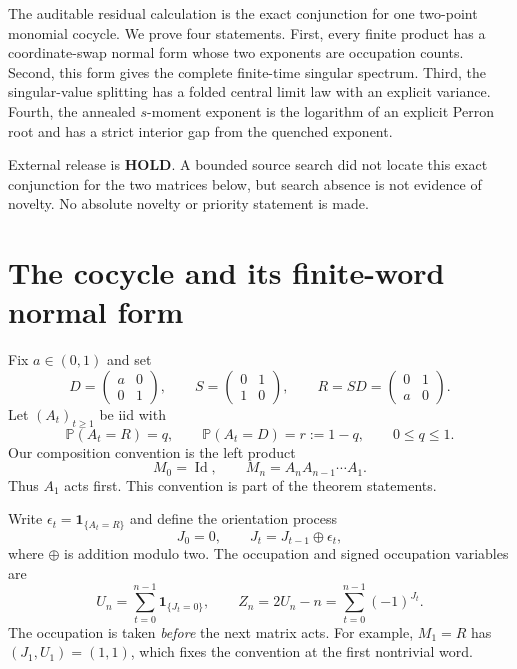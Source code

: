 \documentclass[11pt,a4paper]{amsart}
\theoremstyle{definition}
\theoremstyle{remark}
\newcommand{\Prob}{\mathbb P}
\newcommand{\Id}{\operatorname{Id}}
\newcommand{\one}{\mathbf 1}
\begin{document}
The auditable residual calculation is the exact conjunction for one
two-point monomial cocycle.  We prove four statements.  First, every
finite product has a coordinate-swap normal form whose two exponents are
occupation counts.  Second, this form gives the complete finite-time
singular spectrum.  Third, the singular-value splitting has a folded
central limit law with an explicit variance.  Fourth, the annealed
$s$-moment exponent is the logarithm of an explicit Perron root and has a
strict interior gap from the quenched exponent.

External release is \textbf{HOLD}.  A bounded source search did not locate
this exact conjunction for the two matrices below, but search absence is
not evidence of novelty.  No absolute novelty or priority statement is
made.

\section{The cocycle and its finite-word normal form}
\label{sec:normal}

Fix $a\in(0,1)$ and set
\begin{equation}\label{eq:generators}
 D=\begin{pmatrix}a&0\\0&1\end{pmatrix},\qquad
 S=\begin{pmatrix}0&1\\1&0\end{pmatrix},\qquad
 R=SD=\begin{pmatrix}0&1\\a&0\end{pmatrix}.
\end{equation}
Let $(A_t)_{t\geq1}$ be iid with
\begin{equation}\label{eq:law}
 \Prob(A_t=R)=q,\qquad \Prob(A_t=D)=r:=1-q,
 \qquad 0\leq q\leq1.
\end{equation}
Our composition convention is the left product
\begin{equation}\label{eq:left-product}
 M_0=\Id,\qquad M_n=A_nA_{n-1}\cdots A_1.
\end{equation}
Thus $A_1$ acts first.  This convention is part of the theorem statements.

Write $\epsilon_t=\one_{\{A_t=R\}}$ and define the orientation process
\begin{equation}\label{eq:orientation}
 J_0=0,\qquad J_t=J_{t-1}\mathbin{\oplus}\epsilon_t,
\end{equation}
where $\oplus$ is addition modulo two.  The occupation and signed
occupation variables are
\begin{equation}\label{eq:occupation}
 U_n=\sum_{t=0}^{n-1}\one_{\{J_t=0\}},\qquad
 Z_n=2U_n-n=\sum_{t=0}^{n-1}(-1)^{J_t}.
\end{equation}
The occupation is taken \emph{before} the next matrix acts.  For example,
$M_1=R$ has $(J_1,U_1)=(1,1)$, which fixes the convention at the first
nontrivial word.
\end{document}
